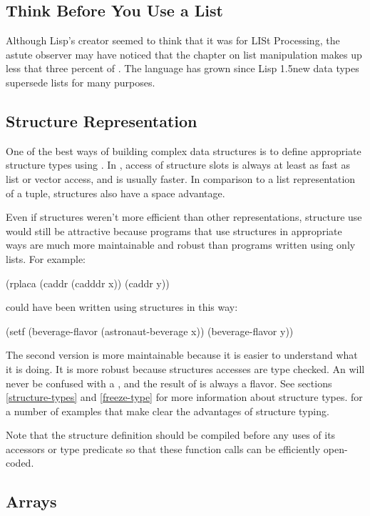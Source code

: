 \subsection{Think Before You Use a List}

Although Lisp's creator seemed to think that it was for LISt
Processing, the astute observer may have noticed that the chapter on
list manipulation makes up less that three percent of \cltltwo{}. The
language has grown since Lisp 1.5\dash{}new data types supersede lists
for many purposes.


\subsection{Structure Representation}
 One of the best ways of
building complex data structures is to define appropriate structure
types using .  In \python, access of structure
slots is always at least as fast as list or vector access, and is
usually faster.  In comparison to a list representation of a tuple,
structures also have a space advantage.

Even if structures weren't more efficient than other representations, structure
use would still be attractive because programs that use structures in
appropriate ways are much more maintainable and robust than programs written
using only lists.  For example:
\begin{lisp}
(rplaca (caddr (cadddr x)) (caddr y))
\end{lisp}
could have been written using structures in this way:
\begin{lisp}
(setf (beverage-flavor (astronaut-beverage x)) (beverage-flavor y))
\end{lisp}
The second version is more maintainable because it is easier to
understand what it is doing.  It is more robust because structures
accesses are type checked.  An  will never be confused
with a , and the result of  is
always a flavor.  See sections \ref{structure-types} and
\ref{freeze-type} for more information about structure types.
 for a number of examples that make clear the
advantages of structure typing.

Note that the structure definition should be compiled before any uses
of its accessors or type predicate so that these function calls can be
efficiently open-coded.


\subsection{Arrays}
\label{array-types}

